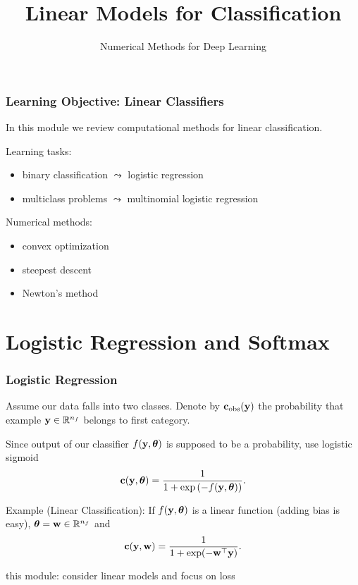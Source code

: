 \documentclass[12pt,fleqn,handout]{beamer}
\title{Linear Models for Classification}
\subtitle{Numerical Methods for Deep Learning}
\date{}
\begin{document}
\makebeamertitle

\begin{frame}
	\frametitle{Learning Objective: Linear  Classifiers}
	
	In this module we review computational methods for linear classification.
	
	\bigskip
	
	Learning tasks:
	\begin{itemize}
		\item binary classification $\leadsto$ logistic regression
		\item multiclass problems $\leadsto$ multinomial logistic regression
	\end{itemize}
	
	\bigskip
	
	Numerical methods:
	\begin{itemize}
		\item convex optimization
		\item steepest descent
		\item Newton's method
	\end{itemize}
\end{frame}


\section{Logistic Regression and Softmax} %
\label{sec:logistic_regression_and_softmax}

\begin{frame}
	\frametitle{Logistic Regression}
	
	
	Assume our data falls into two classes. Denote by ${\bf c}_{\rm obs}({\bf y})$ the probability that example ${\bf y}\in\mathbb{R}^{n_f}$ belongs to first category.
	
	\bigskip
	
	Since output of our classifier $f({\bf y},{\boldsymbol \theta})$ is supposed to be a probability, use logistic sigmoid
	$$
		{\bf c}({\bf y},{\boldsymbol \theta}) = \frac{1}{1 + \exp\left(-f({\bf y},{\boldsymbol \theta})\right)}.
	$$
	
	\bigskip
	
	Example (Linear Classification): If $f({\bf y},{\boldsymbol \theta})$ is a linear function (adding bias is easy), ${\boldsymbol \theta} = {\bf w} \in \mathbb{R}^{n_f}$ and
	$$
		{\bf c}({\bf y},{\bf w}) = \frac{1}{1 + \exp(-{\bf w}^\top{\bf y})}.
	$$
	
	\begin{center}
		this module: consider linear models and focus on loss
	\end{center}
	
\end{frame}
\end{document}
